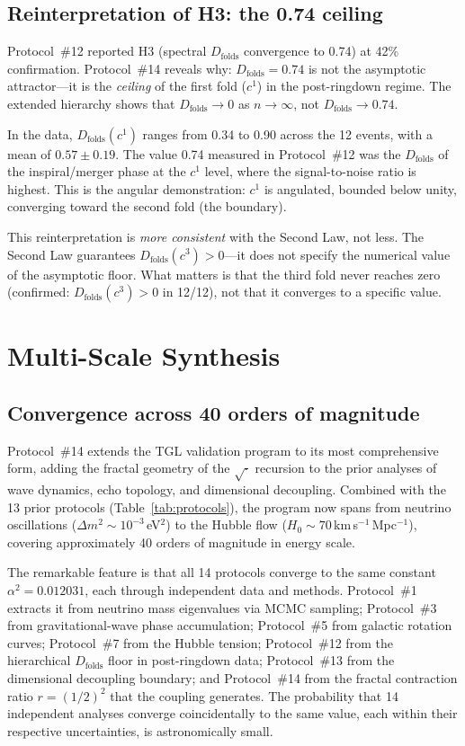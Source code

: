 \documentclass[12pt,a4paper,twocolumn]{article}
\newcommand{\alphaii}{\alpha^{2}}
\newcommand{\Dfolds}{D_{\text{folds}}}
\begin{document}
\subsection{Reinterpretation of H3: the 0.74 ceiling}

Protocol~\#12 reported H3 (spectral $\Dfolds$ convergence to 0.74) at 42\% confirmation. Protocol~\#14 reveals why: $\Dfolds = 0.74$ is not the asymptotic attractor---it is the \emph{ceiling} of the first fold ($c^1$) in the post-ringdown regime. The extended hierarchy shows that $\Dfolds \to 0$ as $n \to \infty$, not $\Dfolds \to 0.74$.

In the data, $\Dfolds(c^1)$ ranges from 0.34 to 0.90 across the 12 events, with a mean of $0.57 \pm 0.19$. The value 0.74 measured in Protocol~\#12 was the $\Dfolds$ of the inspiral/merger phase at the $c^1$ level, where the signal-to-noise ratio is highest. This is the angular demonstration: $c^1$ is angulated, bounded below unity, converging toward the second fold (the boundary).

This reinterpretation is \emph{more consistent} with the Second Law, not less. The Second Law guarantees $\Dfolds(c^3) > 0$---it does not specify the numerical value of the asymptotic floor. What matters is that the third fold never reaches zero (confirmed: $\Dfolds(c^3) > 0$ in 12/12), not that it converges to a specific value.



\section{Multi-Scale Synthesis}
\label{sec:synthesis}

\subsection{Convergence across 40 orders of magnitude}

Protocol~\#14 extends the TGL validation program to its most comprehensive form, adding the fractal geometry of the $\sqrt{\cdot}$ recursion to the prior analyses of wave dynamics, echo topology, and dimensional decoupling. Combined with the 13 prior protocols (Table~\ref{tab:protocols}), the program now spans from neutrino oscillations ($\Delta m^2 \sim 10^{-3}$\,eV$^2$) to the Hubble flow ($H_0 \sim 70$\,km\,s$^{-1}$\,Mpc$^{-1}$), covering approximately 40 orders of magnitude in energy scale.

The remarkable feature is that all 14 protocols converge to the same constant $\alphaii = 0.012031$, each through independent data and methods. Protocol~\#1 extracts it from neutrino mass eigenvalues via MCMC sampling; Protocol~\#3 from gravitational-wave phase accumulation; Protocol~\#5 from galactic rotation curves; Protocol~\#7 from the Hubble tension; Protocol~\#12 from the hierarchical $\Dfolds$ floor in post-ringdown data; Protocol~\#13 from the dimensional decoupling boundary; and Protocol~\#14 from the fractal contraction ratio $r = (1/2)^2$ that the coupling generates. The probability that 14 independent analyses converge coincidentally to the same value, each within their respective uncertainties, is astronomically small.
\end{document}
